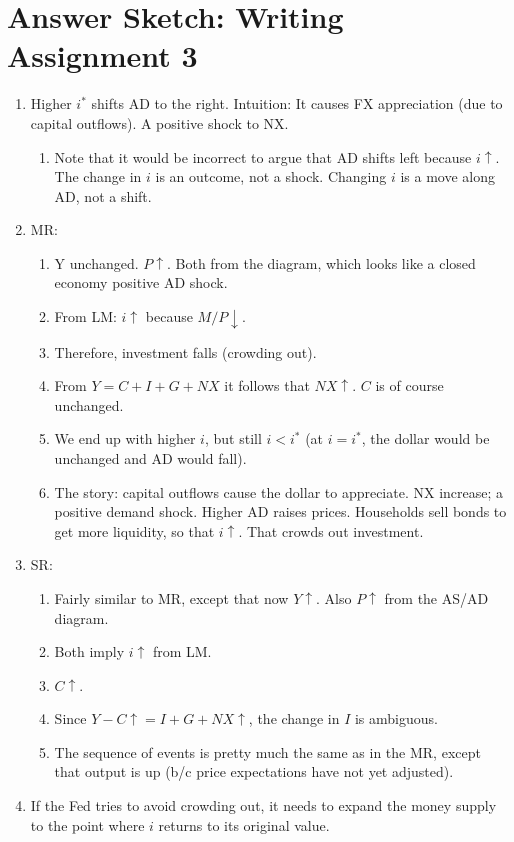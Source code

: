 \documentclass[]{article}
\date{}
\begin{document}
\hypertarget{answer-sketch-writing-assignment-3}{%
\section{Answer Sketch: Writing Assignment
3}\label{answer-sketch-writing-assignment-3}}

\begin{enumerate}
\def\labelenumi{\arabic{enumi}.}
\item
  Higher \(i^*\) shifts AD to the right. Intuition: It causes FX
  appreciation (due to capital outflows). A positive shock to NX.

  \begin{enumerate}
  \def\labelenumii{\arabic{enumii}.}
  \item
    Note that it would be incorrect to argue that AD shifts left because
    \(i \uparrow\). The change in \(i\) is an outcome, not a shock.
    Changing \(i\) is a move along AD, not a shift.
  \end{enumerate}
\item
  MR:

  \begin{enumerate}
  \def\labelenumii{\arabic{enumii}.}
  \item
    Y unchanged. \(P \uparrow\). Both from the diagram, which looks like
    a closed economy positive AD shock. 
  \item
    From LM: \(i \uparrow\) because \(M/P \downarrow\). 
  \item
    Therefore, investment falls (crowding out). 
  \item
    From \(Y = C + I + G + NX\) it follows that \(NX \uparrow\). \(C\)
    is of course unchanged.
  \item
    We end up with higher \(i\), but still \(i < i^*\) (at \(i = i^*\),
    the dollar would be unchanged and AD would fall).
  \item
    The story: capital outflows cause the dollar to appreciate. NX
    increase; a positive demand shock. Higher AD raises prices.
    Households sell bonds to get more liquidity, so that \(i \uparrow\).
    That crowds out investment.
  \end{enumerate}
\item
  SR:

  \begin{enumerate}
  \def\labelenumii{\arabic{enumii}.}
  \item
    Fairly similar to MR, except that now \(Y \uparrow\). Also
    \(P \uparrow\) from the AS/AD diagram.
  \item
    Both imply \(i \uparrow\) from LM.
  \item
    \(C \uparrow\).
  \item
    Since \(Y - C \uparrow = I + G + NX \uparrow\), the change in \(I\)
    is ambiguous.
  \item
    The sequence of events is pretty much the same as in the MR, except
    that output is up (b/c price expectations have not yet adjusted).
  \end{enumerate}
\item
  If the Fed tries to avoid crowding out, it needs to expand the money
  supply to the point where \(i\) returns to its original value.


\end{enumerate}
\end{document}
